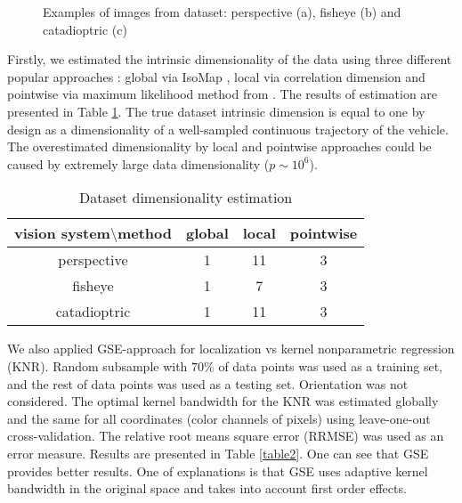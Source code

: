 \documentclass[conference]{IEEEtran} %
\begin{document}
\begin{figure}[h]

  \begin{minipage}{.33\linewidth}
  \centering
  \end{minipage}%
  \begin{minipage}{.33\linewidth}
  \centering
  \end{minipage}
  \begin{minipage}{.33\linewidth}
  \centering
  \end{minipage}

  \caption{Examples of images from dataset: perspective (a), fisheye (b) and catadioptric (c)}
  \label{fig:1}
\end{figure}

Firstly, we estimated the intrinsic dimensionality of the data using three different popular approaches \cite{Camastra2016}: global via IsoMap \cite{Tenenbaum2000}, local via correlation dimension \cite{Granata2016} and pointwise via maximum likelihood method from \cite{Levina2004}.  The results of estimation are presented in Table \ref{table1}. The true dataset intrinsic dimension is equal to one by design as a dimensionality of a well-sampled continuous trajectory of the vehicle. The overestimated dimensionality by local and pointwise approaches could be caused by extremely large data dimensionality ($p\sim 10^6$).

\begin{table}[htbp]
\caption{Dataset dimensionality estimation}
\begin{center}
\begin{tabular}{|c|c|c|c|}
\hline
     vision system$\setminus$method        & global & local & pointwise \\ \hline
perspective  & 1      & 11    & 3        \\ \hline
fisheye      & 1      & 7     & 3        \\ \hline
catadioptric & 1      & 11    & 3        \\ \hline
\end{tabular}
\label{table1}
\end{center}
\end{table}

We also applied GSE-approach for localization vs kernel nonparametric regression (KNR). Random subsample with $70\%$ of data points was used as a training set, and the rest of data points was used as a testing set. Orientation was not considered. The optimal kernel bandwidth for the KNR was estimated globally and the same for all coordinates (color channels of pixels) using leave-one-out cross-validation. The relative root means square error (RRMSE) was used as an error measure. Results are presented in Table \ref{table2}. One can see that GSE provides better results. One of explanations is that GSE uses adaptive kernel bandwidth in the original space and takes into account first order effects.
\end{document}
